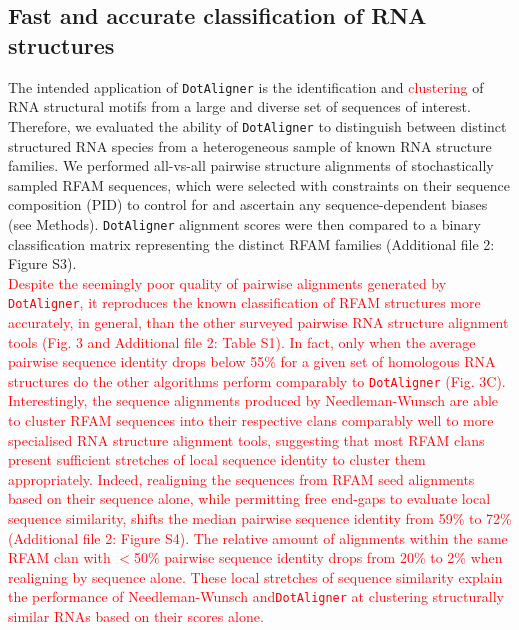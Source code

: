 \documentclass{bmcart}
\newcommand\dotaligner{\texttt{DotAligner}}
\begin{document}
\subsection*{Fast and accurate classification of RNA structures} 

The intended application of \dotaligner{}  is the identification and
\textcolor{red}{clustering} of RNA structural motifs from a large and diverse set of sequences of interest. 
Therefore, we evaluated the ability of \dotaligner{} to distinguish between distinct structured 
RNA species from a heterogeneous sample of known RNA structure families. 
We performed all-vs-all pairwise structure alignments of stochastically sampled RFAM sequences, 
which were selected with constraints on their sequence composition (PID) to 
control for and ascertain any sequence-dependent biases (see Methods). 
\dotaligner{} alignment scores were then compared to a binary classification matrix 
representing the distinct RFAM families (Additional file 2: Figure S3).\\

\textcolor{red}{ Despite the seemingly poor quality of pairwise alignments generated by \dotaligner{}, it 
reproduces the known classification of RFAM structures more accurately, in general, than \textcolor{red}{the} other surveyed pairwise RNA structure alignment tools (Fig. 3 and Additional file 2: Table S1). In fact, only when the average pairwise sequence identity drops below 55\% for a given set of homologous RNA structures do the other algorithms perform comparably to \dotaligner{} (Fig. 3C). 
Interestingly, the sequence alignments produced by Needleman-Wunsch are able to cluster 
RFAM sequences into their respective clans comparably well to more specialised RNA structure
alignment tools, suggesting that most RFAM clans present sufficient stretches of local sequence identity 
to cluster them appropriately. Indeed, realigning the sequences from RFAM seed alignments based on their sequence alone, while permitting free end-gaps to evaluate local sequence similarity, 
shifts the median pairwise sequence identity from 59\% to 72\% (Additional file 2: Figure S4). 
The relative amount of alignments within the same RFAM clan with $<$50\% pairwise 
sequence identity drops from 20\% to 2\% when realigning by sequence alone. 
These local stretches of sequence similarity explain the performance of Needleman-Wunsch and\dotaligner{} at clustering structurally similar RNAs based on their scores alone. }\\
\end{document}
